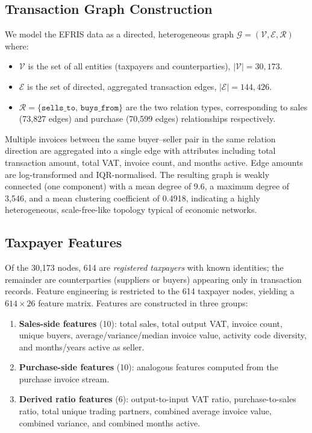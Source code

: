 \documentclass[10pt,twocolumn]{article}
\begin{document}
\subsection{Transaction Graph Construction}

We model the EFRIS data as a directed, heterogeneous graph
$\mathcal{G} = (\mathcal{V}, \mathcal{E}, \mathcal{R})$ where:

\begin{itemize}
  \item $\mathcal{V}$ is the set of all entities (taxpayers and counterparties),
        $|\mathcal{V}| = 30{,}173$.
  \item $\mathcal{E}$ is the set of directed, aggregated transaction edges,
        $|\mathcal{E}| = 144{,}426$.
  \item $\mathcal{R} = \{\texttt{sells\_to},\, \texttt{buys\_from}\}$ are the
        two relation types, corresponding to sales (73,827 edges) and purchase
        (70,599 edges) relationships respectively.
\end{itemize}

Multiple invoices between the same buyer--seller pair in the same relation
direction are aggregated into a single edge with attributes including total
transaction amount, total VAT, invoice count, and months active. Edge amounts
are log-transformed and IQR-normalised. The resulting graph is weakly connected
(one component) with a mean degree of 9.6, a maximum degree of 3,546, and a
mean clustering coefficient of 0.4918, indicating a highly heterogeneous,
scale-free-like topology typical of economic networks.

\subsection{Taxpayer Features}

Of the 30,173 nodes, 614 are \emph{registered taxpayers} with known identities;
the remainder are counterparties (suppliers or buyers) appearing only in
transaction records. Feature engineering is restricted to the 614 taxpayer
nodes, yielding a $614 \times 26$ feature matrix. Features are constructed in
three groups:

\begin{enumerate}
  \item \textbf{Sales-side features} (10): total sales, total output VAT,
        invoice count, unique buyers, average/variance/median invoice value,
        activity code diversity, and months/years active as seller.
  \item \textbf{Purchase-side features} (10): analogous features computed from
        the purchase invoice stream.
  \item \textbf{Derived ratio features} (6): output-to-input VAT ratio,
        purchase-to-sales ratio, total unique trading partners, combined average
        invoice value, combined variance, and combined months active.
\end{enumerate}
\end{document}

